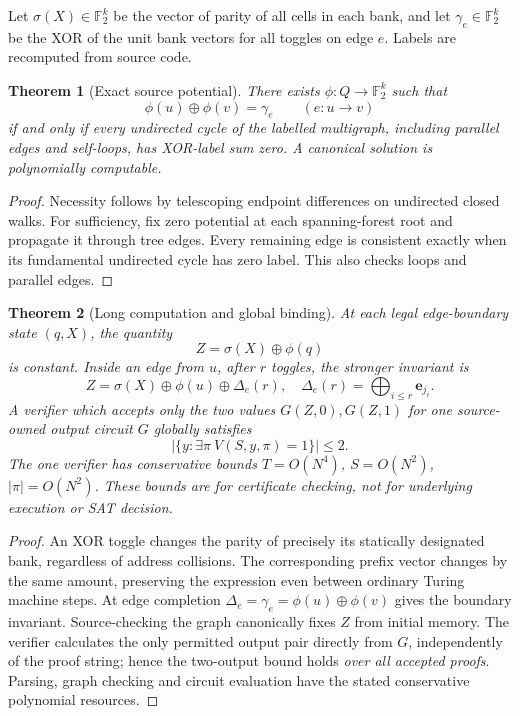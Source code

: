 \documentclass{article}
\newtheorem{theorem}{Theorem}
\begin{document}
Let $\sigma(X)\in\mathbb F_2^k$ be the vector of parity of all cells in each bank, and let $\gamma_e\in\mathbb F_2^k$ be the XOR of the unit bank vectors for all toggles on edge $e$. Labels are recomputed from source code.

\begin{theorem}[Exact source potential]
There exists $\phi:Q\to\mathbb F_2^k$ such that
\[
\phi(u)\oplus\phi(v)=\gamma_e\qquad(e:u\to v)
\]
if and only if \emph{every undirected cycle} of the labelled multigraph, including parallel edges and self-loops, has XOR-label sum zero. A canonical solution is polynomially computable.
\end{theorem}
\begin{proof}
Necessity follows by telescoping endpoint differences on undirected closed walks. For sufficiency, fix zero potential at each spanning-forest root and propagate it through tree edges. Every remaining edge is consistent exactly when its fundamental undirected cycle has zero label. This also checks loops and parallel edges.
\end{proof}

\begin{theorem}[Long computation and global binding]
At each legal edge-boundary state $(q,X)$, the quantity
\[
Z=\sigma(X)\oplus\phi(q)
\]
is constant. Inside an edge from $u$, after $r$ toggles, the stronger invariant is
\[
Z=\sigma(X)\oplus\phi(u)\oplus\Delta_e(r),
\quad \Delta_e(r)=\bigoplus_{i\le r}\mathbf e_{j_i}.
\]
A verifier which accepts only the two values $G(Z,0),G(Z,1)$ for one source-owned output circuit $G$ globally satisfies
\[
|\{y:\exists\pi\ V(S,y,\pi)=1\}|\le2.
\]
The one verifier has conservative bounds $T=O(N^4)$, $S=O(N^2)$, $|\pi|=O(N^2)$. These bounds are for certificate checking, not for underlying execution or SAT decision.
\end{theorem}
\begin{proof}
An XOR toggle changes the parity of precisely its statically designated bank, regardless of address collisions. The corresponding prefix vector changes by the same amount, preserving the expression even between ordinary Turing machine steps. At edge completion $\Delta_e=\gamma_e=\phi(u)\oplus\phi(v)$ gives the boundary invariant. Source-checking the graph canonically fixes $Z$ from initial memory. The verifier calculates the only permitted output pair directly from $G$, independently of the proof string; hence the two-output bound holds \emph{over all accepted proofs}. Parsing, graph checking and circuit evaluation have the stated conservative polynomial resources.
\end{proof}
\end{document}
